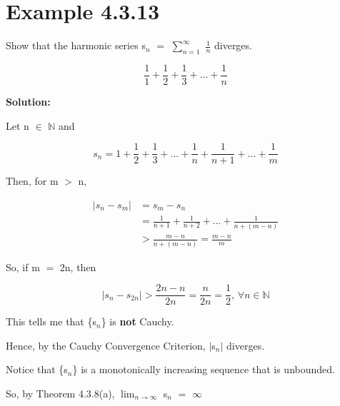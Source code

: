 \documentclass{article}
\newcommand{\mt}[1]{\ensuremath{#1}}
\newcommand\bsc[2][\DefaultOpt]{%
  \def\DefaultOpt{#2}%
  \section[#1]{#2}%
}
\newcommand{\bn}{\mt{\mathbb{N}} }       %
\newcommand{\fa}{\mt{\forall} }          %
\newcommand{\mem}{\mt{\in} }
\newcommand{\av}[1]{\mt{|}#1\mt{|}}  %
\newcommand{\bk}[1]{\{#1\}}
\newcommand{\gr}{\mt{>} }
\newcommand{\eql}{\mt{=} }
\newcommand{\uw}[2]{#1\mt{_{#2}}}
\newcommand{\frc}[2]{\mt{\frac{#1}{#2}}}
\newcommand{\lmti}[1]{\mt{\displaystyle{\lim_{#1 \to \infty}}}}
\newcommand{\eqn}[1]{\[#1\]}
\newcommand{\splt}[1]{\begin{split}#1\end{split}}
\begin{document}
\bsc{Example 4.3.13}{

Show that the harmonic series \uw{s}{n} \eql $\sum_{n = 1}^\infty$ \frc{1}{n} diverges.

\eqn{\frac{1}{1} + \frac{1}{2} + \frac{1}{3} + ... + \frac{1}{n}}

\textbf{Solution:}

Let n \mem \bn and

\eqn{\uw{s}{n} = 1 + \frac{1}{2} + \frac{1}{3} + ... + \frac{1}{n} + \frac{1}{n + 1} + ... + \frac{1}{m}}

Then, for m \gr n,

\eqn{
	\splt{
	|s_n - s_m| & = s_m - s_n \\
	& = \frac{1}{n + 1} + \frac{1}{n + 2} + ... + \frac{1}{n + (m - n)} \\
	& > \frac{m - n}{n + (m - n)} = \frac{m - n}{m}
	}
}

So, if m \eql 2n, then

\eqn{|s_n - s_{2n}| > \frac{2n - n}{2n} = \frac{n}{2n} = \frac{1}{2}\textrm{, }\fa n \mem \bn}

This tells me that \bk{\uw{s}{n}} is \textbf{not} Cauchy.

Hence, by the Cauchy Convergence Criterion, \av{\uw{s}{n}} diverges.

Notice that \bk{\uw{s}{n}} is a monotonically increasing sequence that is unbounded.

So, by Theorem 4.3.8(a), \lmti{n} \uw{s}{n} \eql $\infty$

}
\end{document}
